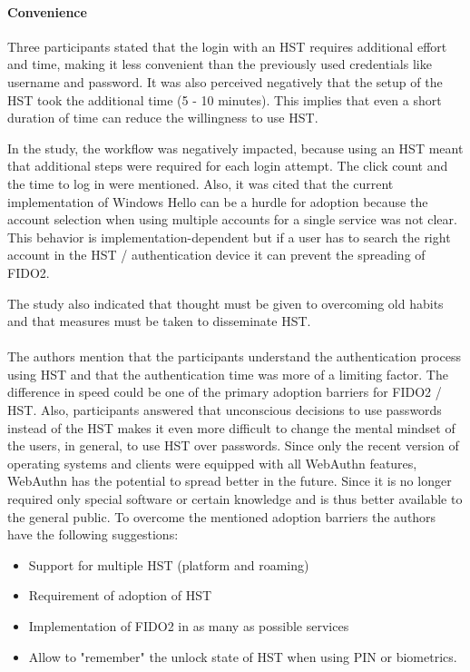 \documentclass[runningheads]{llncs}
\begin{document}
\paragraph{Convenience}
Three participants stated that the login with an HST requires additional effort and time, making it less convenient than the previously used credentials like username and password. It was also perceived negatively that the setup of the HST took the additional time (5 - 10 minutes). This implies that even a short duration of time can reduce the willingness to use HST.

In the study, the workflow was negatively impacted, because using an HST meant that additional steps were required for each login attempt. The click count and the time to log in were mentioned. Also, it was cited that the current implementation of Windows Hello can be a hurdle for adoption because the account selection when using multiple accounts for a single service was not clear. This behavior is implementation-dependent but if a user has to search the right account in the HST / authentication device it can prevent the spreading of FIDO2. 

The study also indicated that thought must be given to overcoming old habits and that measures must be taken to disseminate HST.

\paragraph{}
The authors mention that the participants understand the authentication process using HST and that the authentication time was more of a limiting factor. The difference in speed could be one of the primary adoption barriers for FIDO2 / HST. Also, participants answered that unconscious decisions to use passwords instead of the HST makes it even more difficult to change the mental mindset of the users, in general, to use HST over passwords. Since only the recent version of operating systems and clients were equipped with all WebAuthn features, WebAuthn has the potential to spread better in the future. Since it is no longer required only special software or certain knowledge and is thus better available to the general public. To overcome the mentioned adoption barriers the authors have the following suggestions:
\begin{itemize}
  \item Support for multiple HST (platform and roaming)
  \item Requirement of adoption of HST
  \item Implementation of FIDO2 in as many as possible services
  \item Allow to "remember" the unlock state of HST when using PIN or biometrics.
\end{itemize}
\cite{255646}
\end{document}
